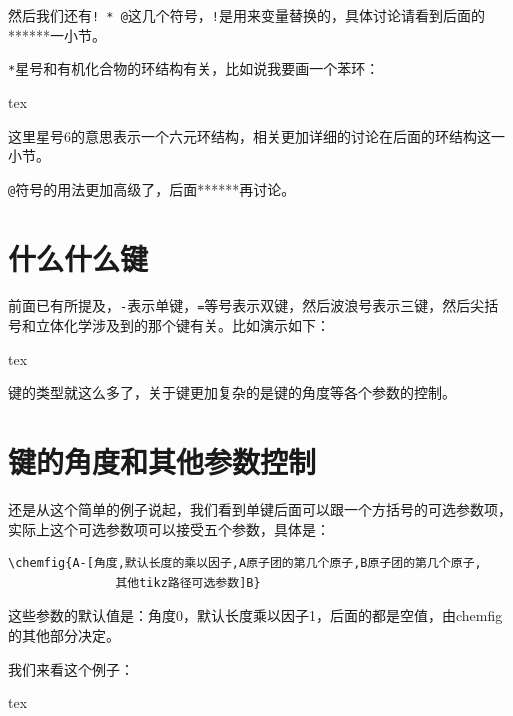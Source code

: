 \documentclass[11pt,oneside]{book}
\begin{document}

然后我们还有\verb+! * @+这几个符号，\verb+!+是用来变量替换的，具体讨论请看到后面的******一小节。

\verb+*+星号和有机化合物的环结构有关，比如说我要画一个苯环：
\begin{tcbcode}{tex}
\end{tcbcode}


这里星号6的意思表示一个六元环结构，相关更加详细的讨论在后面的环结构这一小节。

\verb+@+\@{}符号的用法更加高级了，后面******再讨论。

\section{什么什么键}
\label{sec:什么什么键}
前面已有所提及，\verb+-+表示单键，\verb+=+等号表示双键，然后波浪号表示三键，然后尖括号和立体化学涉及到的那个键有关。比如演示如下：
\begin{tcbcode}{tex}
\end{tcbcode}








键的类型就这么多了，关于键更加复杂的是键的角度等各个参数的控制。

\section{键的角度和其他参数控制}
还是从这个简单的例子说起，我们看到单键后面可以跟一个方括号的可选参数项，实际上这个可选参数项可以接受五个参数，具体是：
\begin{Verbatim}
\chemfig{A-[角度,默认长度的乘以因子,A原子团的第几个原子,B原子团的第几个原子,
               其他tikz路径可选参数]B}
\end{Verbatim}

这些参数的默认值是：角度0，默认长度乘以因子1，后面的都是空值，由chemfig的其他部分决定。

我们来看这个例子：
\begin{tcbcode}[]{tex}
\end{tcbcode}
\end{document}
